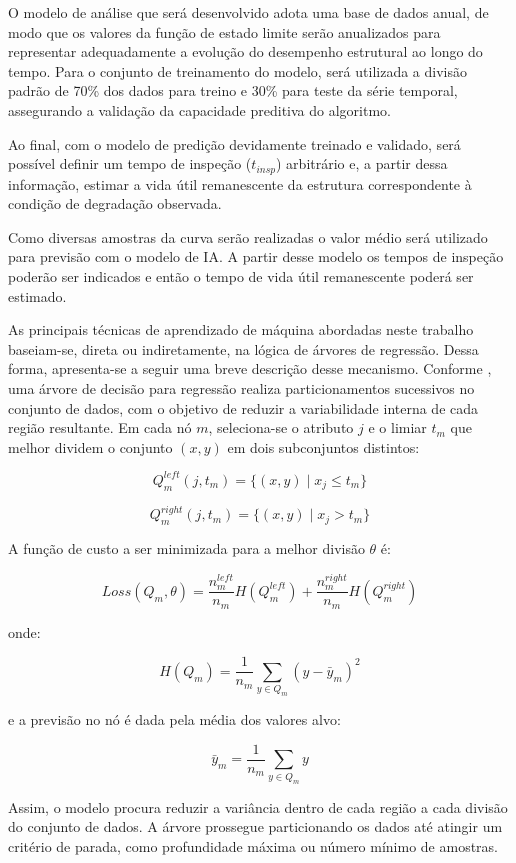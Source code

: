 O modelo de análise que será desenvolvido adota uma base de dados anual, de modo que os valores da função de estado limite serão anualizados para representar adequadamente a evolução do desempenho estrutural ao longo do tempo. Para o conjunto de treinamento do modelo, será utilizada a divisão padrão de 70\% dos dados para treino e 30\% para teste da série temporal, assegurando a validação da capacidade preditiva do algoritmo. 

Ao final, com o modelo de predição devidamente treinado e validado, será possível definir um tempo de inspeção ($t_{insp}$) arbitrário e, a partir dessa informação, estimar a vida útil remanescente da estrutura correspondente à condição de degradação observada.

Como diversas amostras da curva serão realizadas o valor médio será utilizado para previsão com o modelo de IA. A partir desse modelo os tempos de inspeção poderão ser indicados e então o tempo de vida útil remanescente poderá ser estimado.

As principais técnicas de aprendizado de máquina abordadas neste trabalho baseiam-se, direta ou indiretamente, na lógica de árvores de regressão. Dessa forma, apresenta-se a seguir uma breve descrição desse mecanismo. Conforme \textcite{Cruvinel2024ConcreteAI}, uma árvore de decisão para regressão realiza particionamentos sucessivos no conjunto de dados, com o objetivo de reduzir a variabilidade interna de cada região resultante. Em cada nó $m$, seleciona-se o atributo $j$ e o limiar $t_m$ que melhor dividem o conjunto $(x, y)$ em dois subconjuntos distintos:

\[
Q_m^{left}(j,t_m) = \{ (x, y) \mid x_j \le t_m \}
\]

\[
Q_m^{right}(j,t_m) = \{ (x, y) \mid x_j > t_m \}
\]

A função de custo a ser minimizada para a melhor divisão $\theta$ é:

\[
Loss(Q_m, \theta) =
\frac{n_m^{left}}{n_m} H(Q_m^{left}) +
\frac{n_m^{right}}{n_m} H(Q_m^{right})
\]

onde:

\[
H(Q_m) = \frac{1}{n_m} \sum_{y \in Q_m} (y - \bar{y}_m)^2
\]

e a previsão no nó é dada pela média dos valores alvo:

\[
\bar{y}_m = \frac{1}{n_m} \sum_{y \in Q_m} y
\]

Assim, o modelo procura reduzir a variância dentro de cada região a
cada divisão do conjunto de dados. A árvore prossegue particionando os
dados até atingir um critério de parada, como profundidade máxima ou
número mínimo de amostras.














